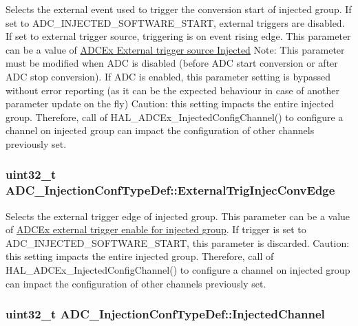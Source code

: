 Selects the external event used to trigger the conversion start of injected group. If set to A\-D\-C\-\_\-\-I\-N\-J\-E\-C\-T\-E\-D\-\_\-\-S\-O\-F\-T\-W\-A\-R\-E\-\_\-\-S\-T\-A\-R\-T, external triggers are disabled. If set to external trigger source, triggering is on event rising edge. This parameter can be a value of \hyperlink{group___a_d_c_ex___external__trigger__source___injected}{A\-D\-C\-Ex External trigger source Injected} Note\-: This parameter must be modified when A\-D\-C is disabled (before A\-D\-C start conversion or after A\-D\-C stop conversion). If A\-D\-C is enabled, this parameter setting is bypassed without error reporting (as it can be the expected behaviour in case of another parameter update on the fly) Caution\-: this setting impacts the entire injected group. Therefore, call of H\-A\-L\-\_\-\-A\-D\-C\-Ex\-\_\-\-Injected\-Config\-Channel() to configure a channel on injected group can impact the configuration of other channels previously set. \hypertarget{struct_a_d_c___injection_conf_type_def_a4f2cfa808b5ace1e47fc3f94da7b850f}{
\subsubsection[{External\-Trig\-Injec\-Conv\-Edge}]{\setlength{\rightskip}{0pt plus 5cm}uint32\-\_\-t A\-D\-C\-\_\-\-Injection\-Conf\-Type\-Def\-::\-External\-Trig\-Injec\-Conv\-Edge}}\label{struct_a_d_c___injection_conf_type_def_a4f2cfa808b5ace1e47fc3f94da7b850f}
Selects the external trigger edge of injected group. This parameter can be a value of \hyperlink{group___a_d_c_ex___external__trigger__edge___injected}{A\-D\-C\-Ex external trigger enable for injected group}. If trigger is set to A\-D\-C\-\_\-\-I\-N\-J\-E\-C\-T\-E\-D\-\_\-\-S\-O\-F\-T\-W\-A\-R\-E\-\_\-\-S\-T\-A\-R\-T, this parameter is discarded. Caution\-: this setting impacts the entire injected group. Therefore, call of H\-A\-L\-\_\-\-A\-D\-C\-Ex\-\_\-\-Injected\-Config\-Channel() to configure a channel on injected group can impact the configuration of other channels previously set. \hypertarget{struct_a_d_c___injection_conf_type_def_aad0cab6ed3f66e8ffa4bd0490298b715}{
\subsubsection[{Injected\-Channel}]{\setlength{\rightskip}{0pt plus 5cm}uint32\-\_\-t A\-D\-C\-\_\-\-Injection\-Conf\-Type\-Def\-::\-Injected\-Channel}}\label{struct_a_d_c___injection_conf_type_def_aad0cab6ed3f66e8ffa4bd0490298b715}
